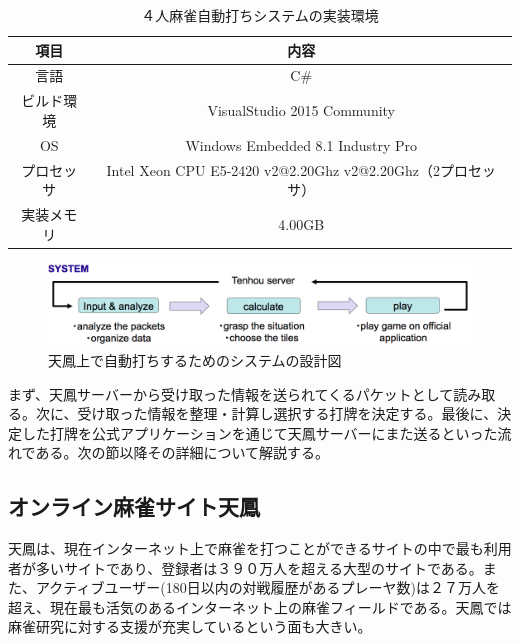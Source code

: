 

\begin{table}[h]
  \caption{４人麻雀自動打ちシステムの実装環境}
  \label{imp1}
  \begin{center}
  \begin{tabular}{c|c}
    \hline
    項目  & 内容 \\\hline\hline
    言語  & C\# \\\hline
    ビルド環境  & VisualStudio 2015 Community\\\hline
    OS & Windows Embedded 8.1 Industry Pro \\\hline
    プロセッサ & Intel Xeon CPU E5-2420 v2@2.20Ghz v2@2.20Ghz（2プロセッサ）\\\hline
    実装メモリ & 4.00GB\\\hline
  \end{tabular}\end{center}
\end{table}


\begin{figure}[h]
 \centering
 \includegraphics[keepaspectratio, scale=0.4
 ,bb=0 0 1226 243]
      {img/imp1.png}
 \caption{天鳳上で自動打ちするためのシステムの設計図}
 \label{2flow}
\end{figure}

まず、天鳳サーバーから受け取った情報を送られてくるパケットとして読み取る。次に、受け取った情報を整理・計算し選択する打牌を決定する。最後に、決定した打牌を公式アプリケーションを通じて天鳳サーバーにまた送るといった流れである。次の節以降その詳細について解説する。

\subsection{オンライン麻雀サイト天鳳}
天鳳は、現在インターネット上で麻雀を打つことができるサイトの中で最も利用者が多いサイトであり、登録者は３９０万人を超える大型のサイトである。また、アクティブユーザー(180日以内の対戦履歴があるプレーヤ数)は２７万人を超え、現在最も活気のあるインターネット上の麻雀フィールドである。天鳳では麻雀研究に対する支援が充実しているという面も大きい。

